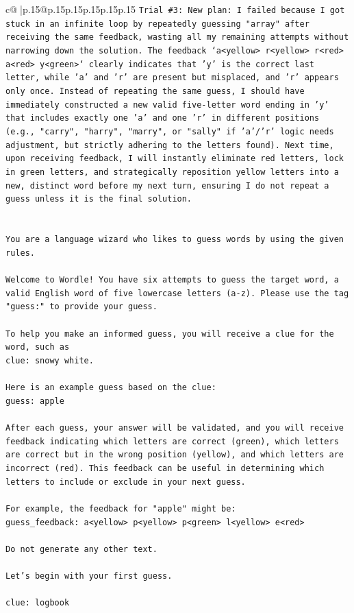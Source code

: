 \documentclass{article}
\begin{document}
{\begin{supertabular}{c@{$\;$}|p{.15\linewidth}@{}p{.15\linewidth}p{.15\linewidth}p{.15\linewidth}p{.15\linewidth}p{.15\linewidth}}
{{{\texttt{Trial \#3: New plan: I failed because I got stuck in an infinite loop by repeatedly guessing "array" after receiving the same feedback, wasting all my remaining attempts without narrowing down the solution. The feedback `a<yellow> r<yellow> r<red> a<red> y<green>` clearly indicates that 'y' is the correct last letter, while 'a' and 'r' are present but misplaced, and 'r' appears only once. Instead of repeating the same guess, I should have immediately constructed a new valid five{-}letter word ending in 'y' that includes exactly one 'a' and one 'r' in different positions (e.g., "carry", "harry", "marry", or "sally" if 'a'/'r' logic needs adjustment, but strictly adhering to the letters found). Next time, upon receiving feedback, I will instantly eliminate red letters, lock in green letters, and strategically reposition yellow letters into a new, distinct word before my next turn, ensuring I do not repeat a guess unless it is the final solution.} \\
\\ 
\\ 
\texttt{You are a language wizard who likes to guess words by using the given rules.} \\
\\ 
\texttt{Welcome to Wordle! You have six attempts to guess the target word, a valid English word of five lowercase letters (a{-}z). Please use the tag "guess:" to provide your guess.} \\
\\ 
\texttt{To help you make an informed guess, you will receive a clue for the word, such as} \\
\texttt{clue: snowy white.} \\
\\ 
\texttt{Here is an example guess based on the clue: } \\
\texttt{guess: apple} \\
\\ 
\texttt{After each guess, your answer will be validated, and you will receive feedback indicating which letters are correct (green), which letters are correct but in the wrong position (yellow), and which letters are incorrect (red). This feedback can be useful in determining which letters to include or exclude in your next guess.} \\
\\ 
\texttt{For example, the feedback for "apple" might be:} \\
\texttt{guess\_feedback: a<yellow> p<yellow> p<green> l<yellow> e<red>} \\
\\ 
\texttt{Do not generate any other text.} \\
\\ 
\texttt{Let's begin with your first guess.} \\
\\ 
\texttt{clue: logbook} \\
            }
        }
    }
     \\ \\


\end{supertabular}}
\end{document}
